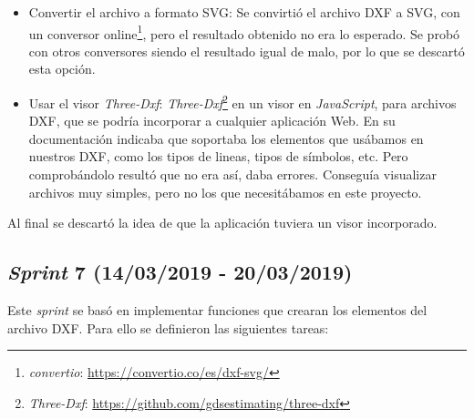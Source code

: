 \begin{itemize}
\item Convertir el archivo a formato SVG: Se convirtió el archivo DXF a SVG, con un conversor online\footnote{\textsl{convertio}: \url{https://convertio.co/es/dxf-svg/}}, pero el resultado obtenido no era lo esperado. Se probó con otros conversores siendo el resultado igual de malo, por lo que se descartó esta opción.
  
\item Usar el visor \emph{Three-Dxf}: \emph{Three-Dxf}\footnote{\textsl{Three-Dxf}: \url{https://github.com/gdsestimating/three-dxf}} en un visor en \emph{JavaScript}, para archivos DXF, que se podría incorporar a cualquier aplicación Web. En su documentación indicaba que soportaba los elementos que usábamos en nuestros DXF, como los tipos de lineas, tipos de símbolos, etc. Pero comprobándolo resultó que no era así, daba errores. Conseguía visualizar archivos muy simples, pero no los que necesitábamos en este proyecto.
\end{itemize}

Al final se descartó la idea de que la aplicación tuviera un visor incorporado.

\subsection{\emph{Sprint} 7 (14/03/2019 - 20/03/2019)}

Este \emph{sprint} se basó en implementar funciones que crearan los elementos del archivo DXF. Para ello se definieron las siguientes tareas:

